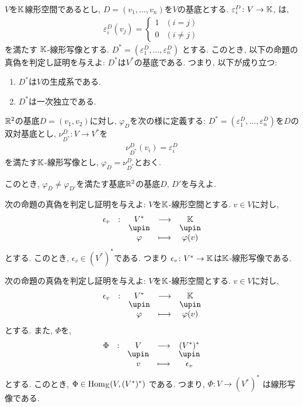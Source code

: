 \begin{quiz}
  $V$を$\mathbb{K}$線形空間であるとし,
  $D=(v_1,\ldots,v_n)$を$V$の基底とする.
  $\varepsilon^{D}_i\colon V\to \mathbb{K}$,
  は,
  \begin{align*}
    \varepsilon^{D}_i(v_j)=
    \begin{cases}
      1&(i=j)\\
      0&(i\neq j)
    \end{cases}
  \end{align*}
  を満たす
  $\mathbb{K}$-線形写像とする.
  $D^\ast=(\varepsilon^{D}_1,\ldots,\varepsilon^{D}_n)$
  とする.
  このとき, 
  以下の命題の真偽を判定し証明を与えよ:
  $D^\ast$は$V^\ast$の基底である.
  つまり, 以下が成り立つ:
  \begin{enumerate}
  \item $D^\ast$は$V$の生成系である.
  \item $D^\ast$は一次独立である.
  \end{enumerate}
\end{quiz}

\begin{quiz}
  $\mathbb{R}^2$の基底$D=(v_1,v_2)$に対し,
  $\varphi_D$を次の様に定義する:
  $D^\ast=(\varepsilon^{D}_1,\ldots,\varepsilon^{D}_n)$を$D$の双対基底とし,
  $\nu^{D}_{D^\ast}\colon V\to V^\ast$を
  \begin{align*}
    \nu^{D}_{D^\ast}(v_i)=\varepsilon^{D}_i
  \end{align*}
  を満たす$\mathbb{K}$-線形写像とし,
  $\varphi_D=\nu^{D}_{D^\ast}$とおく.

  このとき, $\varphi_D\neq \varphi_{D'}$を満たす基底$\mathbb{R}^2$の基底$D$, $D'$を与えよ.
\end{quiz}

\begin{quiz}
  次の命題の真偽を判定し証明を与えよ:
  $V$を$\mathbb{K}$-線形空間とする.
  $v\in V$に対し,
  \begin{align*}
    \shazo{\epsilon_v}{V^\ast}{\KK}
    {\varphi}{\varphi(v)}
  \end{align*}
  とする.
  このとき,
  $\epsilon_v\in (V^\ast)^\ast$である.
  つまり
  $\epsilon_v\colon V^\ast \to \mathbb{K}$は$\mathbb{K}$-線形写像である.    
\end{quiz}

\begin{quiz}
  次の命題の真偽を判定し証明を与えよ:
  $V$を$\mathbb{K}$-線形空間とする.
  $v\in V$に対し,
  \begin{align*}
    \shazo{\epsilon_v}{V^\ast}{\KK}
    {\varphi}{\varphi(v)}
  \end{align*}
  とする.
  また, $\Phi$を,
  \begin{align*}
    \shazo{\Phi}{V}{(V^\ast)^\ast}
    {v}{\epsilon_v}
  \end{align*}
  とする.
  このとき, 
  $\Phi\in\operatorname{Hom}_{\mathbb{K}}( V, (V^\ast)^\ast)$
  である.
  つまり,
  $\Phi\colon V\to (V^\ast)^\ast$
  は線形写像である.    
\end{quiz}

